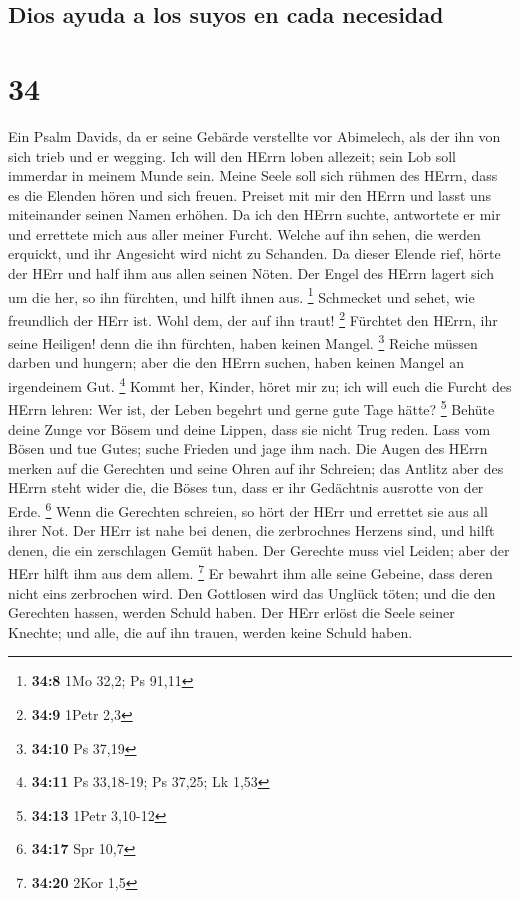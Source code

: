\hypertarget{dios-ayuda-a-los-suyos-en-cada-necesidad}{%
\subsection{Dios ayuda a los suyos en cada
necesidad}\label{dios-ayuda-a-los-suyos-en-cada-necesidad}}

\hypertarget{section-33}{%
\section{34}\label{section-33}}

 Ein Psalm Davids, da er seine Gebärde verstellte vor
Abimelech, als der ihn von sich trieb und er wegging.  Ich
will den HErrn loben allezeit; sein Lob soll immerdar in meinem Munde
sein.  Meine Seele soll sich rühmen des HErrn, dass es die
Elenden hören und sich freuen.  Preiset mit mir den HErrn
und lasst uns miteinander seinen Namen erhöhen.  Da ich
den HErrn suchte, antwortete er mir und errettete mich aus aller meiner
Furcht.  Welche auf ihn sehen, die werden erquickt, und
ihr Angesicht wird nicht zu Schanden.  Da dieser Elende
rief, hörte der HErr und half ihm aus allen seinen Nöten. 
Der Engel des HErrn lagert sich um die her, so ihn fürchten, und hilft
ihnen aus. \footnote{\textbf{34:8} 1Mo 32,2; Ps 91,11} 
Schmecket und sehet, wie freundlich der HErr ist. Wohl dem, der auf ihn
traut! \footnote{\textbf{34:9} 1Petr 2,3}  Fürchtet den
HErrn, ihr seine Heiligen! denn die ihn fürchten, haben keinen Mangel.
\footnote{\textbf{34:10} Ps 37,19}  Reiche müssen darben
und hungern; aber die den HErrn suchen, haben keinen Mangel an
irgendeinem Gut. \footnote{\textbf{34:11} Ps 33,18-19; Ps 37,25; Lk 1,53}
 Kommt her, Kinder, höret mir zu; ich will euch die
Furcht des HErrn lehren:  Wer ist, der Leben begehrt und
gerne gute Tage hätte? \footnote{\textbf{34:13} 1Petr 3,10-12}
 Behüte deine Zunge vor Bösem und deine Lippen, dass sie
nicht Trug reden.  Lass vom Bösen und tue Gutes; suche
Frieden und jage ihm nach.  Die Augen des HErrn merken
auf die Gerechten und seine Ohren auf ihr Schreien;  das
Antlitz aber des HErrn steht wider die, die Böses tun, dass er ihr
Gedächtnis ausrotte von der Erde. \footnote{\textbf{34:17} Spr 10,7}
 Wenn die Gerechten schreien, so hört der HErr und
errettet sie aus all ihrer Not.  Der HErr ist nahe bei
denen, die zerbrochnes Herzens sind, und hilft denen, die ein
zerschlagen Gemüt haben.  Der Gerechte muss viel Leiden;
aber der HErr hilft ihm aus dem allem. \footnote{\textbf{34:20} 2Kor 1,5}
 Er bewahrt ihm alle seine Gebeine, dass deren nicht eins
zerbrochen wird.  Den Gottlosen wird das Unglück töten;
und die den Gerechten hassen, werden Schuld haben.  Der
HErr erlöst die Seele seiner Knechte; und alle, die auf ihn trauen,
werden keine Schuld haben.

